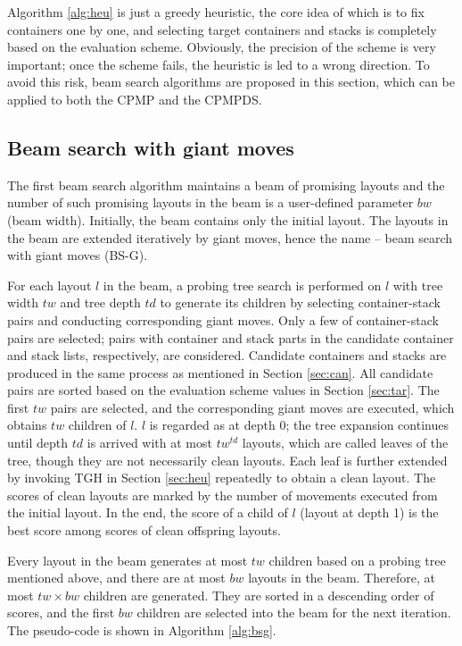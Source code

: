 \documentclass[review,3p,times,authoryear,12pt]{elsarticle}
\begin{document}
Algorithm \ref{alg:heu} is just a greedy heuristic, the core idea of which is to fix containers one by one, and selecting target containers and stacks is completely based on the evaluation scheme.
Obviously, the precision of the scheme is very important; once the scheme fails, the heuristic is led to a wrong direction.
To avoid this risk, beam search algorithms are proposed in this section, which can be applied to both the CPMP and the CPMPDS.

\subsection{Beam search with giant moves}

The first beam search algorithm maintains a beam of promising layouts and the number of such promising layouts in the beam is a user-defined parameter $\mathit{bw}$ (beam width).
Initially, the beam contains only the initial layout.
The layouts in the beam are extended iteratively by giant moves, hence the name -- beam search with giant moves (BS-G).

For each layout $l$ in the beam, a probing tree search is performed on $l$ with tree width $\mathit{tw}$ and tree depth $\mathit{td}$ to generate its children by selecting container-stack pairs and conducting corresponding giant moves.
Only a few of container-stack pairs are selected; pairs with container and stack parts in the candidate container and stack lists, respectively, are considered.
Candidate containers and stacks are produced in the same process as mentioned in Section \ref{sec:can}.
All candidate pairs are sorted based on the evaluation scheme values in Section \ref{sec:tar}.
The first $\mathit{tw}$ pairs are selected, and the corresponding giant moves are executed, which obtains $\mathit{tw}$ children of $l$.
$l$ is regarded as at depth 0; the tree expansion continues until depth $\mathit{td}$ is arrived with at most $\mathit{tw}^\mathit{td}$ layouts, which are called leaves of the tree, though they are not necessarily clean layouts.
Each leaf is further extended by invoking TGH in Section \ref{sec:heu} repeatedly to obtain a clean layout.
The scores of clean layouts are marked by the number of movements executed from the initial layout.
In the end, the score of a child of $l$ (layout at depth 1) is the best score among scores of clean offspring layouts.

Every layout in the beam generates at most $\mathit{tw}$ children based on a probing tree mentioned above, and there are at most $\mathit{bw}$ layouts in the beam.
Therefore, at most $\mathit{tw}\times \mathit{bw}$ children are generated.
They are sorted in a descending order of scores, and the first $\mathit{bw}$ children are selected into the beam for the next iteration.
The pseudo-code is shown in Algorithm \ref{alg:bsg}.
\end{document}
